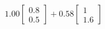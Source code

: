 \documentclass[preview]{standalone}
\begin{document}
\begin{align*}
1.00 \begin{bmatrix} 0.8 \\ 0.5 \end{bmatrix} + 0.58 \begin{bmatrix} 1 \\ 1.6 \end{bmatrix}
\end{align*}
\end{document}
